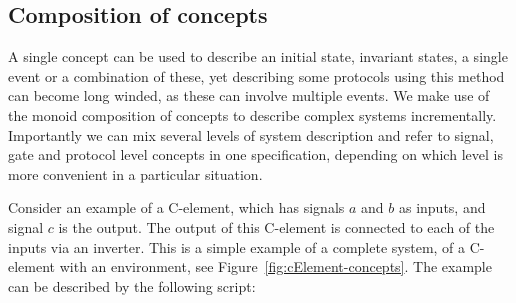 \documentclass[british,compsoc]{IEEEtran}
\begin{document}
\subsection{Composition of concepts\label{sub:Comp-of-concepts}}

A single concept can be used to describe an initial state, invariant
states, a single event or a combination of these, yet describing some
protocols using this method can become long winded, as these can involve
multiple events. We make use of the monoid composition of concepts
to describe complex systems incrementally. Importantly we can mix
several levels of system description and refer to signal, gate and
protocol level concepts in one specification, depending on which level
is more convenient in a particular situation.

Consider an example of a C-element, which has signals $a$ and $b$ as inputs,
and signal $c$ is the output. The output of this C-element is connected to
each of the inputs via an inverter. This is a simple example of a complete
system, of a C-element with an environment, see Figure~\ref{fig:cElement-concepts}.
The example can be described by the following script:
\end{document}

